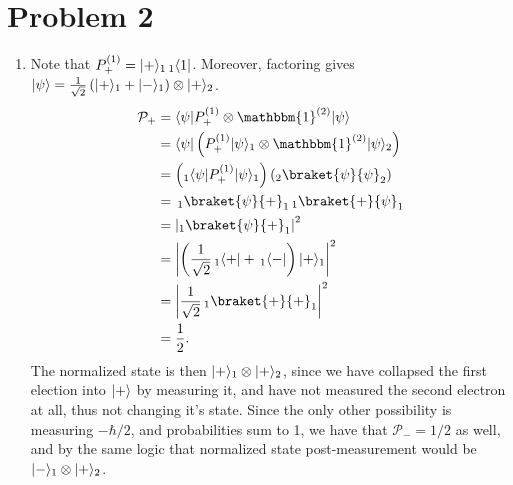 \documentclass[11pt, letterpaper]{article}
\begin{document}
\section*{Problem 2}
\begin{enumerate}
	\item Note that $P_+^{(1)} =\lvert+\rangle_1\,_1 \langle1\rvert$. Moreover, factoring gives $\lvert\psi \rangle =\frac{1}{\sqrt{2} } \left( \lvert+\rangle_1+\lvert-\rangle_1 \right) \otimes \lvert+\rangle_2$.
		\begin{align*}
			\mathcal{P}_{+} &=\bra{\psi } P_+^{(1)} \otimes \mathbbm{1}^{(2)} \ket{\psi } \\
					&=\bra{\psi } \left( P_+^{(1)}\ket{\psi }_1 \otimes \mathbbm{1}^{(2)} \ket{\psi }_2 \right) \\
					&=\left(_1 \bra{\psi }P_+^{(1)} \ket{\psi }_1\right)\left(_2\braket{\psi }{\psi }_2 \right) \\
					&=\,_1\braket{\psi }{+} _1\,_1\braket{+}{\psi }_1\\
					&=\left| _1 \braket{\psi }{+}_1 \right| ^2\\
					&=\left| \left(\frac{1}{\sqrt{2} }  \,_1\bra{+} +\,_1\bra{-}  \right) \ket{+}_1 \right| ^2\\
					&=\left| \frac{1}{\sqrt{2} }\,_1\braket{+}{+}_1  \right|^2\\
					&=\frac{1}{2} 
		.\end{align*}
		The normalized state is then $\lvert+\rangle_1\otimes \lvert+\rangle_2$, since we have collapsed the first election into $\lvert+\rangle $ by measuring it, and have not measured the second electron at all, thus not changing it's state. Since the only other possibility is measuring $-\hbar /2$, and probabilities sum to 1, we have that $\mathcal{P}_{-} =1/2$ as well, and by the same logic that normalized state post-measurement would be $\lvert-\rangle_1\otimes \lvert+\rangle _2$.


\end{enumerate}
\end{document}
